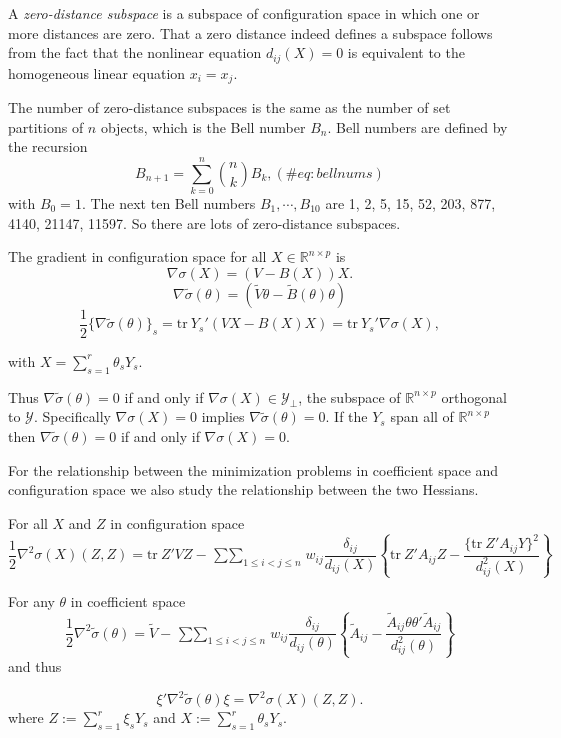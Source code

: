 \documentclass[
  12pt,
  letterpaper,
  DIV=11,
  numbers=noendperiod]{scrreprt}
\theoremstyle{remark}
\begin{document}
A \emph{zero-distance subspace} is a subspace of configuration space in
which one or more distances are zero. That a zero distance indeed
defines a subspace follows from the fact that the nonlinear equation
\(d_{ij}(X)=0\) is equivalent to the homogeneous linear equation
\(x_i=x_j\).

The number of zero-distance subspaces is the same as the number of set
partitions of \(n\) objects, which is the Bell number \(B_n\). Bell
numbers are defined by the recursion \begin{equation}
B_{n+1}=\sum_{k=0}^n\binom{n}{k}B_k, 
(\#eq:bellnums)
\end{equation} with \(B_0=1\). The next ten Bell numbers
\(B_1,\cdots,B_{10}\) are 1, 2, 5, 15, 52, 203, 877, 4140, 21147, 11597.
So there are lots of zero-distance subspaces.

The gradient in configuration space for all
\(X\in\mathbb{R}^{n\times p}\) is \[
\nabla\sigma(X)=(V-B(X))X.
\] \[
\nabla\tilde\sigma(\theta)=(\tilde V\theta-\tilde B(\theta)\theta)
\] \[
\frac12\{\nabla\tilde\sigma(\theta)\}_s=\text{tr}\ Y_s'(VX-B(X)X)=\text{tr}\ Y_s'\nabla\sigma(X),
\]

with \(X=\sum_{s=1}^r\theta_sY_s\).

Thus \(\nabla\tilde\sigma(\theta)=0\) if and only if
\(\nabla\sigma(X)\in\mathcal{Y}_\perp\), the subspace of
\(\mathbb{R}^{n\times p}\) orthogonal to \(\mathcal{Y}\). Specifically
\(\nabla\sigma(X)=0\) implies \(\nabla\tilde\sigma(\theta)=0\). If the
\(Y_s\) span all of \(\mathbb{R}^{n\times p}\) then
\(\nabla\tilde\sigma(\theta)=0\) if and only if \(\nabla\sigma(X)=0\).

For the relationship between the minimization problems in coefficient
space and configuration space we also study the relationship between the
two Hessians.

For all \(X\) and \(Z\) in configuration space \[
\frac12\nabla^2\sigma(X)(Z,Z)=\text{tr}\ Z'VZ-\mathop{\sum\sum}_{1\leq i<j\leq n}w_{ij}\frac{\delta_{ij}}{d_{ij}(X)}\left\{\text{tr}\ Z'A_{ij}Z-\frac{\{\text{tr}\ Z'A_{ij}Y\}^2}{d_{ij}^2(X)}\right\}
\]

For any \(\theta\) in coefficient space \[
\frac12\nabla^2\tilde\sigma(\theta)=\tilde V-\mathop{\sum\sum}_{1\leq i<j\leq n}w_{ij}\frac{\delta_{ij}}{d_{ij}(\theta)}\left\{\tilde A_{ij}-\frac{\tilde A_{ij}\theta\theta'\tilde A_{ij}}{d_{ij}^2(\theta)}\right\}
\] and thus

\[
\xi'\nabla^2\tilde\sigma(\theta)\xi=\nabla^2\sigma(X)(Z,Z).
\] where \(Z:=\sum_{s=1}^r\xi_s Y_s\) and
\(X:=\sum_{s=1}^r\theta_s Y_s\).
\end{document}
